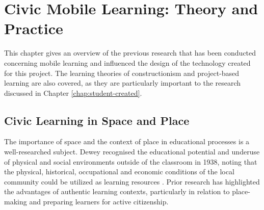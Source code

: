 \chapter{Civic Mobile Learning: Theory and Practice}
\label{chap:MobileLearning}

This chapter gives an overview of the previous research that has been conducted concerning mobile learning and influenced the design of the technology created for this project. The learning theories of constructionism and project-based learning are also covered, as they are particularly important to the research discussed in Chapter \ref{chap:student-created}.

\section{Civic Learning in Space and Place} 

The importance of space and the context of place in educational processes is a well-researched subject. Dewey recognised the educational potential and underuse of physical and social environments outside of the classroom in 1938, noting that the physical, historical, occupational and economic conditions of the local community could be utilized as learning resources \citep{Dewey1938}. Prior research has highlighted the advantages of authentic learning contexts, particularly in relation to place-making and preparing learners for active citizenship.

